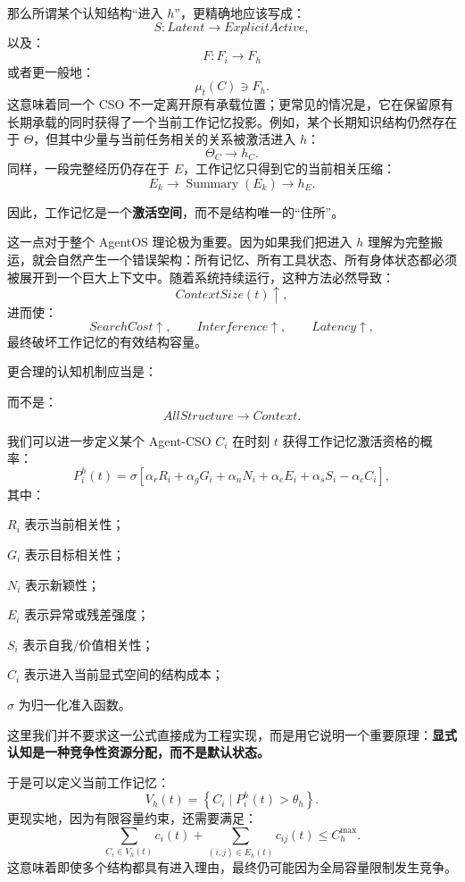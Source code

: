 那么所谓某个认知结构“进入 $h$”，更精确地应该写成：
\[
S:
Latent
\rightarrow
ExplicitActive,
\]
以及：
\[
F:
F_i
\rightarrow
F_h
\]
或者更一般地：
\[
\mu_t(C)
\ni
F_h.
\]
这意味着同一个 CSO 不一定离开原有承载位置；更常见的情况是，它在保留原有长期承载的同时获得了一个当前工作记忆投影。例如，某个长期知识结构仍然存在于 $\Theta$，但其中少量与当前任务相关的关系被激活进入 $h$：
\[
\Theta_C
\rightarrow
h_C.
\]
同样，一段完整经历仍存在于 $E$，工作记忆只得到它的当前相关压缩：
\[
E_k
\rightarrow
\operatorname{Summary}(E_k)
\rightarrow
h_E.
\]

因此，工作记忆是一个\textbf{激活空间}，而不是结构唯一的“住所”。

这一点对于整个 AgentOS 理论极为重要。因为如果我们把进入 $h$ 理解为完整搬运，就会自然产生一个错误架构：所有记忆、所有工具状态、所有身体状态都必须被展开到一个巨大上下文中。随着系统持续运行，这种方法必然导致：
\[
ContextSize(t)\uparrow,
\]
进而使：
\[
SearchCost\uparrow,
\qquad
Interference\uparrow,
\qquad
Latency\uparrow,
\]
最终破坏工作记忆的有效结构容量。

更合理的认知机制应当是：
\begin{statementbox}
\centering
{}
\end{statementbox}
而不是：
\[
AllStructure\rightarrow Context.
\]

我们可以进一步定义某个 Agent-CSO $C_i$ 在时刻 $t$ 获得工作记忆激活资格的概率：
\[
P_i^{h}(t)
=
\sigma
\left[
\alpha_rR_i
+
\alpha_gG_i
+
\alpha_nN_i
+
\alpha_eE_i
+
\alpha_sS_i
-
\alpha_cC_i
\right],
\]
其中：

$R_i$ 表示当前相关性；

$G_i$ 表示目标相关性；

$N_i$ 表示新颖性；

$E_i$ 表示异常或残差强度；

$S_i$ 表示自我/价值相关性；

$C_i$ 表示进入当前显式空间的结构成本；

$\sigma$ 为归一化准入函数。

这里我们并不要求这一公式直接成为工程实现，而是用它说明一个重要原理：\textbf{显式认知是一种竞争性资源分配，而不是默认状态。}

于是可以定义当前工作记忆：
\[
V_h(t)
=
\left\{
C_i
\mid
P_i^{h}(t)>\theta_h
\right\}.
\]
更现实地，因为有限容量约束，还需要满足：
\[
\sum_{C_i\in V_h(t)}
c_i(t)
+
\sum_{(i,j)\in E_h(t)}
c_{ij}(t)
\leq
C_h^{\max}.
\]
这意味着即使多个结构都具有进入理由，最终仍可能因为全局容量限制发生竞争。

